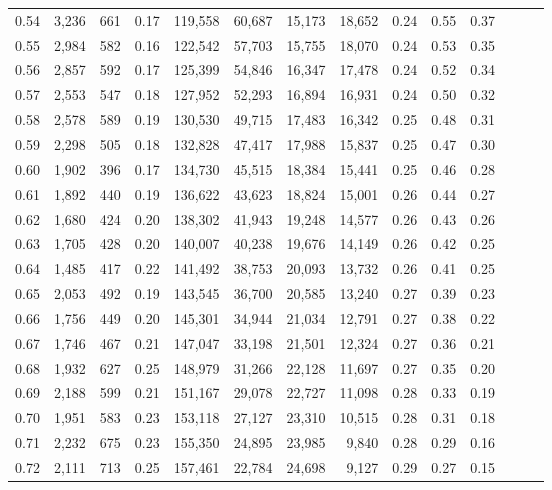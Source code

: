 \begin{tabular}{rrrrrrrrrrrrrr}
0.54 &  3,236 &  661 &  0.17 &  119,558 &   60,687 &  15,173 &  18,652 &  0.24 &  0.55 &      0.37 \\
0.55 &  2,984 &  582 &  0.16 &  122,542 &   57,703 &  15,755 &  18,070 &  0.24 &  0.53 &      0.35 \\
0.56 &  2,857 &  592 &  0.17 &  125,399 &   54,846 &  16,347 &  17,478 &  0.24 &  0.52 &      0.34 \\
0.57 &  2,553 &  547 &  0.18 &  127,952 &   52,293 &  16,894 &  16,931 &  0.24 &  0.50 &      0.32 \\
0.58 &  2,578 &  589 &  0.19 &  130,530 &   49,715 &  17,483 &  16,342 &  0.25 &  0.48 &      0.31 \\
0.59 &  2,298 &  505 &  0.18 &  132,828 &   47,417 &  17,988 &  15,837 &  0.25 &  0.47 &      0.30 \\
0.60 &  1,902 &  396 &  0.17 &  134,730 &   45,515 &  18,384 &  15,441 &  0.25 &  0.46 &      0.28 \\
0.61 &  1,892 &  440 &  0.19 &  136,622 &   43,623 &  18,824 &  15,001 &  0.26 &  0.44 &      0.27 \\
0.62 &  1,680 &  424 &  0.20 &  138,302 &   41,943 &  19,248 &  14,577 &  0.26 &  0.43 &      0.26 \\
0.63 &  1,705 &  428 &  0.20 &  140,007 &   40,238 &  19,676 &  14,149 &  0.26 &  0.42 &      0.25 \\
0.64 &  1,485 &  417 &  0.22 &  141,492 &   38,753 &  20,093 &  13,732 &  0.26 &  0.41 &      0.25 \\
0.65 &  2,053 &  492 &  0.19 &  143,545 &   36,700 &  20,585 &  13,240 &  0.27 &  0.39 &      0.23 \\
0.66 &  1,756 &  449 &  0.20 &  145,301 &   34,944 &  21,034 &  12,791 &  0.27 &  0.38 &      0.22 \\
0.67 &  1,746 &  467 &  0.21 &  147,047 &   33,198 &  21,501 &  12,324 &  0.27 &  0.36 &      0.21 \\
0.68 &  1,932 &  627 &  0.25 &  148,979 &   31,266 &  22,128 &  11,697 &  0.27 &  0.35 &      0.20 \\
0.69 &  2,188 &  599 &  0.21 &  151,167 &   29,078 &  22,727 &  11,098 &  0.28 &  0.33 &      0.19 \\
0.70 &  1,951 &  583 &  0.23 &  153,118 &   27,127 &  23,310 &  10,515 &  0.28 &  0.31 &      0.18 \\
0.71 &  2,232 &  675 &  0.23 &  155,350 &   24,895 &  23,985 &   9,840 &  0.28 &  0.29 &      0.16 \\
0.72 &  2,111 &  713 &  0.25 &  157,461 &   22,784 &  24,698 &   9,127 &  0.29 &  0.27 &      0.15 \\

\end{tabular}
